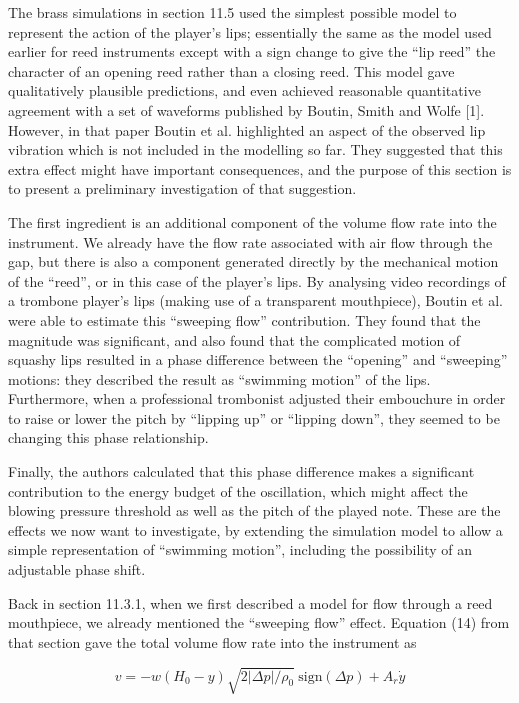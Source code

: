   The brass simulations in section 11.5 used the simplest possible model to 
  represent the action of the player's lips; essentially the same as the model 
  used earlier for reed instruments except with a sign change to give the ``lip 
  reed'' the character of an opening reed rather than a closing reed. This 
  model gave qualitatively plausible predictions, and even achieved reasonable 
  quantitative agreement with a set of waveforms published by Boutin, Smith and 
  Wolfe [1]. However, in that paper Boutin et al. highlighted an aspect of the 
  observed lip vibration which is not included in the modelling so far. They 
  suggested that this extra effect might have important consequences, and the 
  purpose of this section is to present a preliminary investigation of that 
  suggestion. 

  The first ingredient is an additional component of the volume flow rate into 
  the instrument. We already have the flow rate associated with air flow 
  through the gap, but there is also a component generated directly by the 
  mechanical motion of the ``reed'', or in this case of the player's lips. By 
  analysing video recordings of a trombone player's lips (making use of a 
  transparent mouthpiece), Boutin et al. were able to estimate this ``sweeping 
  flow'' contribution. They found that the magnitude was significant, and also 
  found that the complicated motion of squashy lips resulted in a phase 
  difference between the ``opening'' and ``sweeping'' motions: they described 
  the result as ``swimming motion'' of the lips. Furthermore, when a 
  professional trombonist adjusted their embouchure in order to raise or lower 
  the pitch by ``lipping up'' or ``lipping down'', they seemed to be changing 
  this phase relationship. 

  Finally, the authors calculated that this phase difference makes a 
  significant contribution to the energy budget of the oscillation, which might 
  affect the blowing pressure threshold as well as the pitch of the played 
  note. These are the effects we now want to investigate, by extending the 
  simulation model to allow a simple representation of ``swimming motion'', 
  including the possibility of an adjustable phase shift. 

  Back in section 11.3.1, when we first described a model for flow through a 
  reed mouthpiece, we already mentioned the ``sweeping flow'' effect. Equation 
  (14) from that section gave the total volume flow rate into the instrument as 

  \begin{equation*}v=-w(H_0-y) \sqrt{2 |\Delta p|/\rho_0} \mathrm{~sign} 
  (\Delta p)+A_r \dot{y} \tag{1}\end{equation*} 

